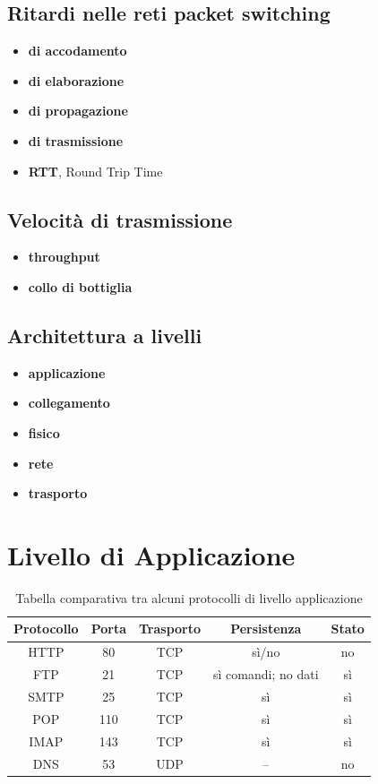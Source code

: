 \documentclass[12pt,a4paper]{article}
\begin{document}
\subsection{Ritardi nelle reti packet switching}
\begin{itemize}
  \item \textbf{di accodamento}
  \item \textbf{di elaborazione}
  \item \textbf{di propagazione}
  \item \textbf{di trasmissione}
  \item \textbf{RTT}, Round Trip Time
\end{itemize}

\subsection{Velocità di trasmissione}
\begin{itemize}
  \item \textbf{throughput}
  \item \textbf{collo di bottiglia}
\end{itemize}

\subsection{Architettura a livelli}
\begin{itemize}
  \item \textbf{applicazione}
  \item \textbf{collegamento}
  \item \textbf{fisico}
  \item \textbf{rete}
  \item \textbf{trasporto}
\end{itemize}

\section{Livello di Applicazione}
\begin{table}[H]
  \centering
  \begin{tabular}{| c | c | c | c | c |}\hline
  Protocollo  & Porta & Trasporto & Persistenza         & Stato \\ \hline
  HTTP        & 80    & TCP       & sì/no               & no    \\ \hline
  FTP         & 21    & TCP       & sì comandi; no dati & sì    \\ \hline
  SMTP        & 25    & TCP       & sì                  & sì    \\ \hline
  POP         & 110   & TCP       & sì                  & sì    \\ \hline
  IMAP        & 143   & TCP       & sì                  & sì    \\ \hline
  DNS         & 53    & UDP       & --                  & no    \\ \hline
  \end{tabular}
  \caption{Tabella comparativa tra alcuni protocolli di livello applicazione}
\end{table}
\end{document}
